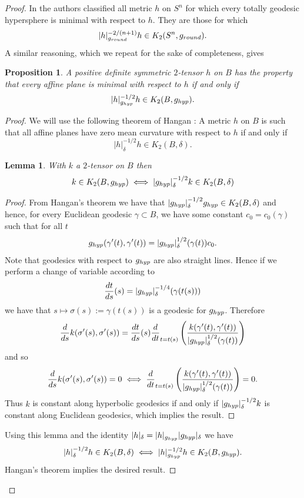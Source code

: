 \documentclass[11pt]{amsart}
\newtheorem{lemm}[thm]{Lemma}
\newtheorem{prop}[thm]{Proposition}
\theoremstyle{remark}
\theoremstyle{definition}
\begin{document}
{{\begin{proof}
		In  \cite[Theorem 9.8]{amb-marques-neves} the authors classified all metric $h$ on $S^n$  for which every totally geodesic hypersphere is minimal with respect to $h$. They are those for which
		$$|h|_{g_{\rm round}}^{-2/(n+1)}h\in K_2(S^n,g_{\rm round}).$$
		A similar reasoning, which we repeat for the sake of completeness, gives
		\begin{prop}
			A positive definite symmetric $2$-tensor $h$ on $B$ has the property that every affine plane   is minimal with respect to $h$ if and only if  $$|h|_{g_{\rm hyp}}^{-1/2}h\in K_2(B,g_{\rm hyp}).$$
		\end{prop}
		\begin{proof}
			We will use the following theorem of Hangan \cite{Han1} :
			A metric $h$ on $B$ is such that all affine planes have zero mean curvature with respect to $h$ if and only if
			$$|h|_{\delta}^{-1/2}h\in K_2(B,\delta).$$
			\begin{lemm} With $k$ a $2$-tensor on $B$ then
				$$k\in K_2(B,g_{\rm hyp})\iff  |g_{\rm hyp}|_{\delta}^{-1/2}k\in K_2(B,\delta)$$
			\end{lemm}
			\begin{proof}
				From Hangan's theorem we have that $|g_{\rm hyp}|_{\delta}^{-1/2}g_{\rm hyp}\in K_2(B,\delta)$ and hence,  for every Euclidean geodesic $\gamma\subset B$, we  have some constant $c_0=c_0(\gamma)$ such that for all $t$
				$$g_{\rm hyp}(\gamma'(t),\gamma'(t))=|g_{\rm hyp}|_{\delta}^{1/2}(\gamma(t))c_0.$$
				Note that geodesics with respect to $g_{\rm hyp}$ are also straight lines. Hence  if  we perform a change of variable according to
				$$\frac{dt}{ds}(s)=|g_{\rm hyp}|_{\delta}^{-1/4}(\gamma(t(s)))$$ we have that $s\mapsto \sigma(s):=\gamma(t(s))$ is a geodesic for $g_{\rm hyp}$.  Therefore
				$$
				\frac{d}{ds}k(\sigma'(s),\sigma'(s))=\frac{dt}{ds}(s)\frac{d}{dt}_{t=t(s)}\left(\frac{k(\gamma'(t),\gamma'(t))}{|g_{\rm hyp}|_{\delta}^{1/2}(\gamma(t))}\right)
				$$
				and so
				$$
				\frac{d}{ds}k(\sigma'(s),\sigma'(s))=0 \iff \frac{d}{dt}_{t=t(s)}\left(\frac{k(\gamma'(t),\gamma'(t))}{|g_{\rm hyp}|_{\delta}^{1/2}(\gamma(t))}\right)=0.
				$$
				Thus $k$ is constant along hyperbolic geodesics if and only if  $|g_{\rm hyp}|_{\delta}^{-1/2}k$ is constant along Euclidean geodesics, which implies the result.
			\end{proof}
			Using this lemma and the identity $|h|_{\delta}=|h|_{g_{\rm hyp}}|g_{\rm hyp}|_{\delta}$ we have
			$$ |h|_{\delta}^{-1/2}h\in K_2(B,\delta) \iff |h|_{g_{\rm hyp}}^{-1/2}h\in K_2(B,g_{\rm hyp}).$$
			Hangan's theorem \cite{Han1} implies the desired result.
		\end{proof}
		

\end{proof}}}
\end{document}
